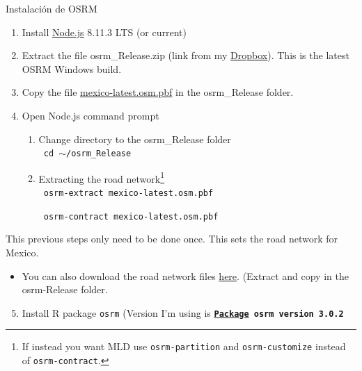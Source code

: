 \documentclass[8pt]{beamer}
\begin{document}
\appendix
\begin{frame}[label=dist]{Instalación de OSRM}

\begin{enumerate}[(1)]
    \item Install \color{blue}\href{https://nodejs.org/en/}{Node.js} \color{black} 8.11.3 LTS (or current)
    \item Extract the file osrm\_Release.zip (link from my \color{blue}\href{https://www.dropbox.com/s/eeo5f9ws7hmair4/osrm_Release.zip?dl=0}{Dropbox}).\color{black} This is the latest OSRM Windows build.
    \item \color{black} Copy the file  \color{blue}\href{https://download.geofabrik.de/north-america/mexico-latest.osm.pbf}{mexico-latest.osm.pbf} \color{black}in the osrm\_Release folder.
    \item Open Node.js command prompt
   \begin{enumerate}
        \item Change directory to the osrm\_Release folder\\
        
                \texttt{         cd $\sim$/osrm\_Release}  
                
        \item Extracting the road network\footnote{If instead you want MLD use \texttt{osrm-partition} and \texttt{osrm-customize} instead of \texttt{osrm-contract}.}\\
        
                \texttt{         osrm-extract mexico-latest.osm.pbf}
                
                \texttt{         osrm-contract mexico-latest.osm.pbf}
            
    \end{enumerate}
\end{enumerate}

This previous steps only need to be done once. This sets the road network for Mexico.
    \begin{itemize}
        \item You can also download the road network files \color{blue}\href{https://www.dropbox.com/s/2yflj2kfb24ujms/mexico-latest.zip?dl=0}{here}. \color{black} (Extract and copy in the osrm-Release folder. 
    \end{itemize}
    
    \begin{enumerate}[(1)]
\setcounter{enumi}{4}
\item Install R package \texttt{osrm} (Version I'm using is \textbf{\texttt{\href{https://cran.r-project.org/src/contrib/Archive/osrm/}{Package} osrm version 3.0.2}}
    \end{enumerate}
    
\end{frame}
\end{document}
